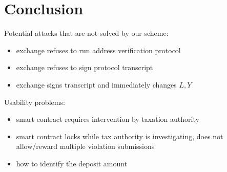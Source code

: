 \section{Conclusion}\label{sec:conclusion}

Potential attacks that are not solved by our scheme:
\begin{itemize}
    \item exchange refuses to run address verification protocol
    \item exchange refuses to sign protocol transcript
    \item exchange signs transcript and immediately changes $L, Y$ 
\end{itemize}

Usability problems:
\begin{itemize}
    \item smart contract requires intervention by taxation authority
    \item smart contract locks while tax authority is investigating, does not allow/reward multiple violation submissions
    \item how to identify the deposit amount
\end{itemize}
